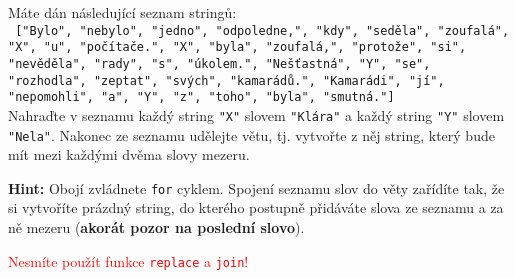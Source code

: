 \question[70]
Máte dán následující seznam stringů:\\
	\texttt{
	["Bylo", "nebylo", "jedno", "odpoledne,", "kdy", "seděla", "zoufalá", "X", "u", "počítače.", "X", "byla",
	"zoufalá,", "protože", "si", "nevěděla", "rady", "s", "úkolem.", "Nešťastná", "Y", "se", "rozhodla", "zeptat",
	"svých", "kamarádů.", "Kamarádi", "jí", "nepomohli", "a", "Y", "z", "toho", "byla", "smutná."]
	}\\
	Nahraďte v seznamu každý string \texttt{"X"} slovem \texttt{"Klára"} a každý
	string \texttt{"Y"} slovem \texttt{"Nela"}. Nakonec ze seznamu udělejte větu,
	tj. vytvořte z něj string, který bude mít mezi každými dvěma slovy mezeru.

\textbf{Hint:} Obojí zvládnete \texttt{for} cyklem. Spojení seznamu slov do věty
zařídíte tak, že si vytvoříte prázdný string, do kterého postupně přidáváte
slova ze seznamu a za ně mezeru (\textbf{akorát pozor na poslední slovo}).

\textcolor{red}{Nesmíte použít funkce \texttt{replace} a \texttt{join}!}